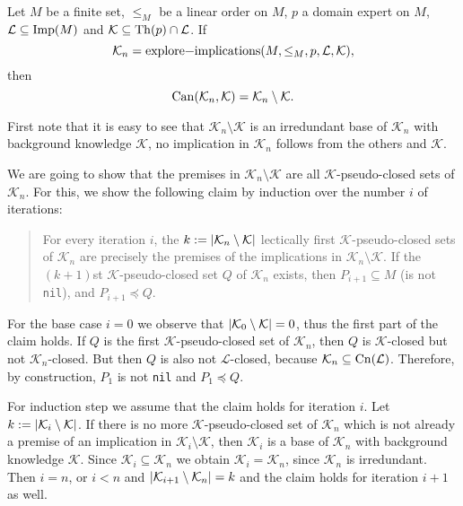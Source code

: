 \begin{Theorem}
  \label{thm:explore-implications-computes-canonical-base}
  Let $M$ be a finite set, $\leq_{M}$ be a linear order on $M$, $p$ a domain expert on
  $M$, $\mathcal{L} \subseteq \operatorname{Imp}(M)$ and $\mathcal{K} \subseteq \operatorname{Th}(p) \cap
  \mathcal{L}$.  If
  \begin{equation*}
    \mathcal{K}_{n} = \text{\lstinline{explore-implications}}(M, \leq_{M}, p, \mathcal{L}, \mathcal{K}),
  \end{equation*}
  then
  \begin{equation*}
    \operatorname{Can}(\mathcal{K}_{n}, \mathcal{K}) = \mathcal{K}_{n} \setminus \mathcal{K}.
  \end{equation*}
\end{Theorem}
\begin{Proof}
  First note that it is easy to see that $\mathcal{K}_{n} \setminus \mathcal{K}$ is an
  irredundant base of $\mathcal{K}_{n}$ with background knowledge $\mathcal{K}$, \ie no
  implication in $\mathcal{K}_{n}$ follows from the others and $\mathcal{K}$.

  We are going to show that the premises in $\mathcal{K}_{n} \setminus \mathcal{K}$ are
  all $\mathcal{K}$-pseudo-closed sets of $\mathcal{K}_{n}$.  For this, we show the
  following claim by induction over the number $i$ of iterations:
  \begin{quote}
    For every iteration $i$, the $k := \lvert \mathcal{K}_{n} \setminus \mathcal{K} \rvert$
    lectically first $\mathcal{K}$-pseudo-closed sets of $\mathcal{K}_{n}$ are precisely
    the premises of the implications in $\mathcal{K}_{n} \setminus \mathcal{K}$.  If the
    $(k+1)$st $\mathcal{K}$-pseudo-closed set $Q$ of $\mathcal{K}_{n}$ exists, then
    $P_{i+1} \subseteq M$ (\ie is not \lstinline{nil}), and $P_{i+1} \preceq Q$.
  \end{quote}

  For the base case $i = 0$ we observe that $\lvert \mathcal{K}_{0} \setminus \mathcal{K} \rvert
  = 0$, thus the first part of the claim holds.  If $Q$ is the first
  $\mathcal{K}$-pseudo-closed set of $\mathcal{K}_{n}$, then $Q$ is $\mathcal{K}$-closed
  but not $\mathcal{K}_{n}$-closed.  But then $Q$ is also not $\mathcal{L}$-closed,
  because $\mathcal{K}_{n} \subseteq \operatorname{Cn}(\mathcal{L})$.  Therefore, by construction,
  $P_{1}$ is not \lstinline{nil} and $P_{1} \preceq Q$.

  For induction step we assume that the claim holds for iteration $i$.  Let $k := \lvert
    \mathcal{K}_{i} \setminus \mathcal{K} \rvert$.  If there is no more
  $\mathcal{K}$-pseudo-closed set of $\mathcal{K}_{n}$ which is not already a premise of
  an implication in $\mathcal{K}_{i} \setminus \mathcal{K}$, then $\mathcal{K}_{i}$ is a
  base of $\mathcal{K}_{n}$ with background knowledge $\mathcal{K}$.  Since
  $\mathcal{K}_{i} \subseteq \mathcal{K}_{n}$ we obtain $\mathcal{K}_{i} =
  \mathcal{K}_{n}$, since $\mathcal{K}_{n}$ is irredundant.  Then $i = n$, or $i < n$ and
  $\lvert \mathcal{K}_{i+1} \setminus \mathcal{K}_{n} \rvert = k$ and the claim holds for
  iteration $i+1$ as well.


\end{Proof}
